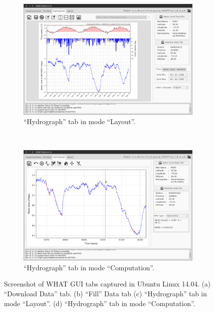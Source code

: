 \documentclass[12pt, letterpaper, fleqn]{report}
\begin{document}
\begin{figure}[h!]
\begin{subfigure}[t]{0.45\textwidth}
                \includegraphics[width=\textwidth]{WHAT_Screenshot002}
                \caption{``Hydrograph'' tab in mode ``Layout''.}
                \label{subfig:ScnShot_002}
        \end{subfigure}
        ~
        \begin{subfigure}[t]{0.45\textwidth}
                \includegraphics[width=\textwidth]{WHAT_Screenshot003}
                \caption{``Hydrograph'' tab in mode ``Computation''.}
                \label{subfig:ScnShot_003}
        \end{subfigure}
        \caption[Screenshots of WHAT GUI tabs captured in Ubuntu Linux 14.04.]{Screenshot of WHAT GUI tabs captured in Ubuntu Linux 14.04. (a) ``Download Data'' tab. (b) ``Fill'' Data tab (c) ``Hydrograph'' tab in mode ``Layout''. (d) ``Hydrograph'' tab in mode ``Computation''.}\label{fig:WHAT_GUI_ScnShot}
\end{figure}
\end{document}
